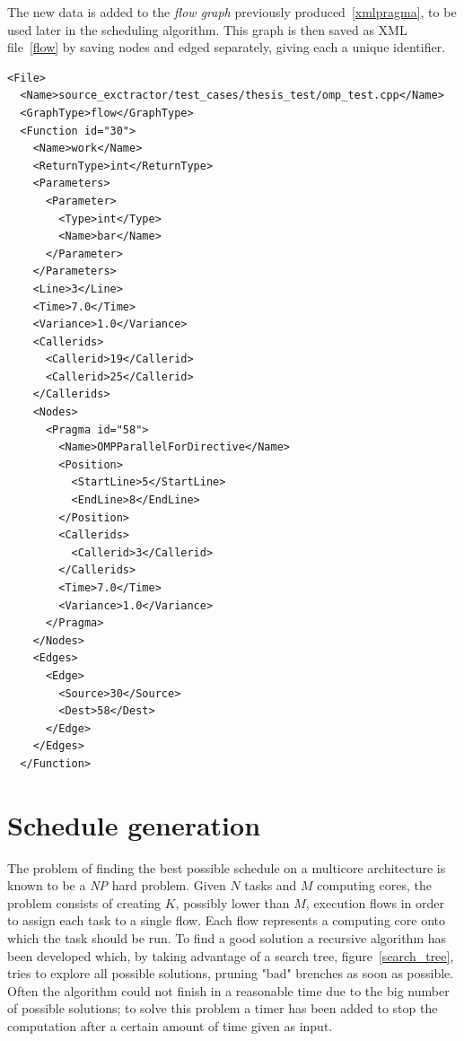 \documentclass[a4paper,11pt,oneside]{book}
\begin{document}
The new data is added to the \emph{flow graph} previously produced~\ref{xmlpragma}, to be used later in the scheduling algorithm. This graph is then saved as XML file~\ref{flow} by saving nodes and edged separately, giving each a unique identifier. 


\lstset{language=XML}
\begin{lstlisting}[caption=Final XML \emph{flow graph}, label=flow]
<File>
  <Name>source_exctractor/test_cases/thesis_test/omp_test.cpp</Name>
  <GraphType>flow</GraphType>
  <Function id="30">
    <Name>work</Name>
    <ReturnType>int</ReturnType>
    <Parameters>
      <Parameter>
        <Type>int</Type>
        <Name>bar</Name>
      </Parameter>
    </Parameters>
    <Line>3</Line>
    <Time>7.0</Time>
    <Variance>1.0</Variance>
    <Callerids>
      <Callerid>19</Callerid>
      <Callerid>25</Callerid>
    </Callerids>
    <Nodes>
      <Pragma id="58">
        <Name>OMPParallelForDirective</Name>
        <Position>
          <StartLine>5</StartLine>
          <EndLine>8</EndLine>
        </Position>
        <Callerids>
          <Callerid>3</Callerid>
        </Callerids>
        <Time>7.0</Time>
        <Variance>1.0</Variance>
      </Pragma>
    </Nodes>
    <Edges>
      <Edge>
        <Source>30</Source>
        <Dest>58</Dest>
      </Edge>
    </Edges>
  </Function>
\end{lstlisting}


\section{Schedule generation}
\label{schedulegeneration}

The problem of finding the best possible schedule on a multicore architecture is known to be a \emph{NP} hard problem. Given $N$ tasks and $M$ computing cores, the problem consists of creating $K$, possibly lower than $M$, execution flows in order to assign each task to a single flow. Each flow represents a computing core onto which the task should be run. To find a good solution a recursive algorithm has been developed which, by taking advantage of a search tree, figure~\ref{search_tree}, tries to explore all possible solutions, pruning "bad" brenches as soon as possible. Often the algorithm could not finish in a reasonable time due to the big number of possible solutions; to solve this problem a timer has been added to stop the computation after a certain amount of time given as input. \\
\end{document}
